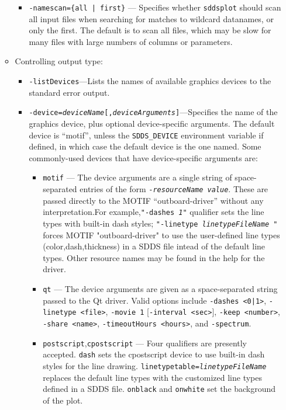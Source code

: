 \begin{itemize}
\begin{itemize}
\begin{itemize}
  \item {\tt -namescan=\{all | first\}} --- Specifies whether {\tt sddsplot} should scan all input files when searching
        for matches to wildcard datanames, or only the first.  The default is to scan all files, which may be slow
        for many files with large numbers of columns or parameters.
  \end{itemize}
   
\item Controlling output type:
  \begin{itemize}
  \item {\tt -listDevices}---Lists the names of available graphics devices to the standard error output.
  \item {\tt -device={\em deviceName}[,{\em deviceArguments}]}---Specifies the name of the graphics
        device, plus optional device-specific arguments.  The default device is ``motif'', unless the
        {\tt SDDS\_DEVICE} environment variable if defined, in which case the default device is the one
        named.
        Some commonly-used devices that have device-specific arguments are:
        \begin{itemize} 
        \item {\tt motif} --- The device arguments are a single string of space-separated entries of the
        form {\tt -{\em resourceName} {\em value}}.  These are passed directly to the MOTIF ``outboard-driver''
        without any interpretation.For example,{\tt "-dashes {\em 1}"} qualifier sets the line types with
        built-in dash styles; {\tt "-linetype {\em linetypeFileName }"} forces MOTIF "outboard-driver" to use
        the user-defined line types (color,dash,thickness)  in a SDDS file intead of the default line types.
        Other resource names may be found in the help for the driver.
        \item {\tt qt} --- The device arguments are given as a space-separated string passed to the Qt
        driver.  Valid options include {\tt -dashes <0|1>}, {\tt -linetype <file>}, {\tt -movie 1}
        [{\tt -interval <sec>}], {\tt -keep <number>}, {\tt -share <name>}, {\tt -timeoutHours <hours>}, and
        {\tt -spectrum}.
        \item {\tt postscript},{\tt cpostscript} --- Four qualifiers are presently accepted. {\tt dash} sets
        the cpostscript device to use built-in dash styles for the line drawing.
        {\tt linetypetable={\em linetypeFileName}} replaces the default line types with the customized line types
        defined in a SDDS file. {\tt onblack} and {\tt onwhite} set the background of the plot.

\end{itemize}
\end{itemize}
\end{itemize}
\end{itemize}

